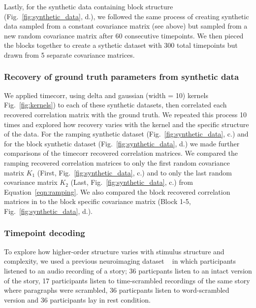 \documentclass[english]{article}
\begin{document}
Lastly, for the synthetic data containing block structure (Fig.~\ref{fig:synthetic_data},  d.), we followed the same
process of creating synthetic data sampled from a constant covariance
matrix (see above) but sampled from a new random covariance matrix
after 60 consecutive timepoints.  We then pieced the blocks together
to create a sythetic dataset with 300 total timepoints but drawn from
5 separate covariance matrices. 

\subsubsection*{Recovery of ground truth parameters from synthetic
  data}


We applied timecorr, using delta and gaussian (width = 10) kernels
Fig.~\ref{fig:kernels}) to each of these 
synthetic datasets, then correlated each recovered
correlation matrix with the ground truth.  We repeated this process 10
times and explored how recovery varies
with the kernel and the specific structure of the data. For the
ramping synthetic dataset (Fig.~\ref{fig:synthetic_data},  c.)  and for the
block synthetic dataset (Fig.~\ref{fig:synthetic_data},  d.)  we made further
comparisons of the timecorr recovered correlation matrices. We
compared the ramping recovered correlation matrices to only the first random covariance matrix $K_{1}$
(First, Fig.~\ref{fig:synthetic_data},  c.) and to only the last
random covariance matrix $K_{2}$ (Last, Fig.~\ref{fig:synthetic_data},
c.) from Equation~\ref{eqn:ramping}. We also compared the block recovered correlation matrices in to
the block specific covariance matrix (Block 1-5,
Fig.~\ref{fig:synthetic_data},  d.).


\subsubsection*{Timepoint decoding}

To explore how higher-order structure varies with stimulus structure
and complexity, we used a previous neuroimaging dataset
~\cite{SimoEtal16}  in which participants listened to an audio recording of a story; 36 particpants listen to an intact version of the story, 17 participants listen to time-scrambled recordings of the same story where paragraphs were scrambled, 36 particpants listen to word-scrambled version and 36 participants lay in rest condition.
\end{document}
